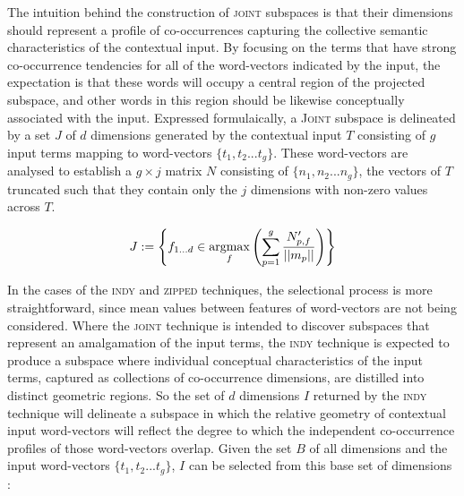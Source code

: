 The intuition behind the construction of \textsc{joint} subspaces is that their dimensions should represent a profile of co-occurrences capturing the collective semantic characteristics of the contextual input.  By focusing on the terms that have strong co-occurrence tendencies for all of the word-vectors indicated by the input, the expectation is that these words will occupy a central region  of the projected subspace, and other words in this region should be likewise conceptually associated with the input.  Expressed formulaically, a \textsc{Joint} subspace is delineated by a set $J$ of $d$ dimensions generated by the contextual input $T$ consisting of $g$ input terms mapping to word-vectors $\{t_1, t_2... t_g\}$.  These word-vectors are analysed to establish a $g \times j$ matrix $N$ consisting of $\{n_1, n_2... n_g\}$, the vectors of $T$ truncated such that they contain only the $j$ dimensions with non-zero values across $T$.  



\begin{equation}
J := \left \{ f_{1...d} \in \operatorname*{argmax}_{f}\left(\sum_{p=1}^{g} \frac{N'_{p,f}}{||m_p||}\right)\right \}
\end{equation}

\noindent In the cases of the \textsc{indy} and \textsc{zipped} techniques, the selectional process is more straightforward, since mean values between features of word-vectors are not being considered.  Where the \textsc{joint} technique is intended to discover subspaces that represent an amalgamation of the input terms, the \textsc{indy} technique is expected to produce a subspace where individual conceptual characteristics of the input terms, captured as collections of co-occurrence dimensions, are distilled into distinct geometric regions.  So the set of $d$ dimensions $I$ returned by the \textsc{indy} technique will delineate a subspace in which the relative geometry of contextual input word-vectors will reflect the degree to which the independent co-occurrence profiles of those word-vectors overlap.  Given the set $B$ of all dimensions and the input word-vectors $\{t_1, t_2... t_g\}$, $I$ can be selected from this base set of dimensions :

